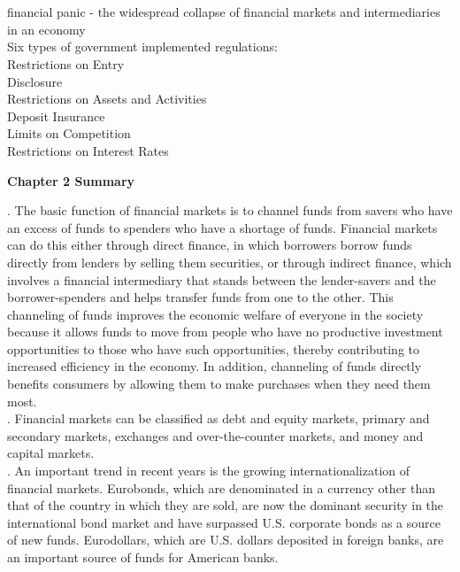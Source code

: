 \documentclass[12pt]{article}
\begin{document}
\\

\\

\noindent financial panic - the widespread collapse of financial markets and intermediaries in an economy\\

\noindent Six types of government implemented regulations:\\
	
\indent Restrictions on Entry\\
\indent Disclosure\\
\indent Restrictions on Assets and Activities\\
\indent Deposit Insurance\\
\indent Limits on Competition\\
\indent Restrictions on Interest Rates\\

\newpage
\begin{center}
\large {\bf Chapter 2 Summary}
\end{center}

. The basic function of financial markets is to channel funds from savers who have an excess of funds to spenders who have a shortage of funds.
Financial markets can do this either through direct finance, in which borrowers borrow funds directly from lenders by selling them securities,
or through indirect finance, which involves a financial intermediary that stands between the lender-savers and the borrower-spenders and helps 
transfer funds from one to the other. This channeling of funds improves the economic welfare of everyone in the society because it allows funds
to move from people who have no productive investment opportunities to those who have such opportunities, thereby contributing to increased efficiency
in the economy. In addition, channeling of funds directly benefits consumers by allowing them to make purchases when they need them most.\\

. Financial markets can be classified as debt and equity markets, primary and secondary markets, exchanges and over-the-counter markets, 
and money and capital markets.\\

. An important trend in recent years is the growing internationalization of financial markets. Eurobonds, which are denominated in a currency
other than that of the country in which they are sold, are now the dominant security in the international bond market and have surpassed 
U.S. corporate bonds as a source of new funds. Eurodollars, which are U.S. dollars deposited in foreign banks, are an important source of funds 
for American banks.\\
\end{document}
